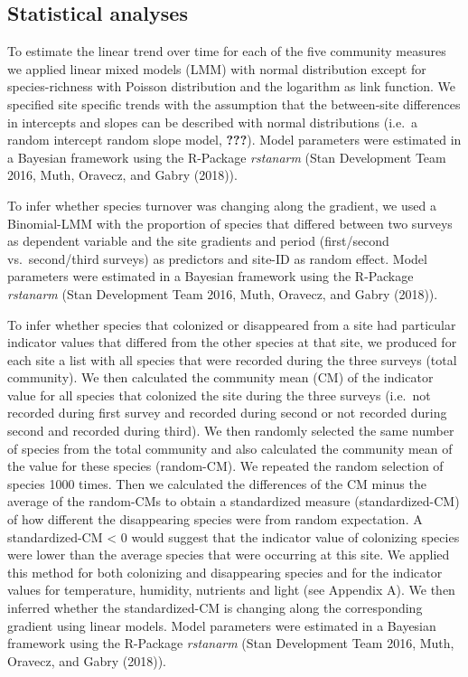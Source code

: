 \documentclass[fleqn,10pt,lineno]{wlpeerj} %
\theoremstyle{definition}
\theoremstyle{definition}
\theoremstyle{definition}
\theoremstyle{remark}
\begin{document}
\subsection*{Statistical analyses}\label{statistical-analyses}

To estimate the linear trend over time for each of the five community
measures we applied linear mixed models (LMM) with normal distribution
except for species-richness with Poisson distribution and the logarithm
as link function. We specified site specific trends with the assumption
that the between-site differences in intercepts and slopes can be
described with normal distributions (i.e.~a random intercept random
slope model, {\textbf{???}}). Model parameters were estimated in a
Bayesian framework using the R-Package \emph{rstanarm} (Stan Development
Team 2016, Muth, Oravecz, and Gabry (2018)).

To infer whether species turnover was changing along the gradient, we
used a Binomial-LMM with the proportion of species that differed between
two surveys as dependent variable and the site gradients and period
(first/second vs.~second/third surveys) as predictors and site-ID as
random effect. Model parameters were estimated in a Bayesian framework
using the R-Package \emph{rstanarm} (Stan Development Team 2016, Muth,
Oravecz, and Gabry (2018)).

To infer whether species that colonized or disappeared from a site had
particular indicator values that differed from the other species at that
site, we produced for each site a list with all species that were
recorded during the three surveys (total community). We then calculated
the community mean (CM) of the indicator value for all species that
colonized the site during the three surveys (i.e.~not recorded during
first survey and recorded during second or not recorded during second
and recorded during third). We then randomly selected the same number of
species from the total community and also calculated the community mean
of the value for these species (random-CM). We repeated the random
selection of species 1000 times. Then we calculated the differences of
the CM minus the average of the random-CMs to obtain a standardized
measure (standardized-CM) of how different the disappearing species were
from random expectation. A standardized-CM \textless{} 0 would suggest
that the indicator value of colonizing species were lower than the
average species that were occurring at this site. We applied this method
for both colonizing and disappearing species and for the indicator
values for temperature, humidity, nutrients and light (see Appendix A).
We then inferred whether the standardized-CM is changing along the
corresponding gradient using linear models. Model parameters were
estimated in a Bayesian framework using the R-Package \emph{rstanarm}
(Stan Development Team 2016, Muth, Oravecz, and Gabry (2018)).
\end{document}
